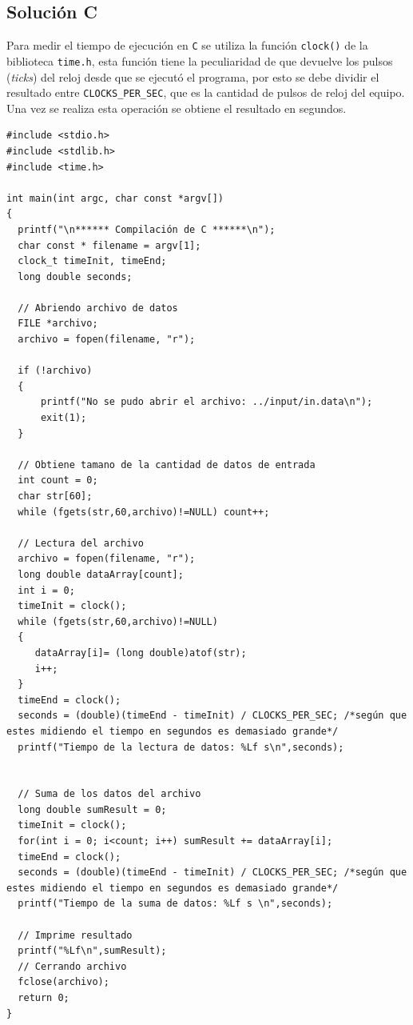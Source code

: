 \subsection{Solución C}

Para medir el tiempo de ejecución en \texttt{C} se utiliza la función \texttt{clock()} de la biblioteca \texttt{time.h}, esta función tiene la peculiaridad de que devuelve los pulsos (\textit{ticks}) del reloj desde que se ejecutó el programa, por esto se debe dividir el resultado entre \texttt{CLOCKS\_PER\_SEC}, que es la cantidad de pulsos de reloj del equipo. Una vez se realiza esta operación se obtiene el resultado en segundos.

\begin{verbatim}
#include <stdio.h>
#include <stdlib.h>
#include <time.h>

int main(int argc, char const *argv[])
{
  printf("\n****** Compilación de C ******\n");
  char const * filename = argv[1];
  clock_t timeInit, timeEnd;
  long double seconds;

  // Abriendo archivo de datos
  FILE *archivo;
  archivo = fopen(filename, "r");

  if (!archivo)
  {
      printf("No se pudo abrir el archivo: ../input/in.data\n");
      exit(1);
  }

  // Obtiene tamano de la cantidad de datos de entrada
  int count = 0;
  char str[60];
  while (fgets(str,60,archivo)!=NULL) count++;

  // Lectura del archivo
  archivo = fopen(filename, "r");
  long double dataArray[count];
  int i = 0;
  timeInit = clock();
  while (fgets(str,60,archivo)!=NULL)
  {
     dataArray[i]= (long double)atof(str);
     i++;
  }
  timeEnd = clock();
  seconds = (double)(timeEnd - timeInit) / CLOCKS_PER_SEC; /*según que estes midiendo el tiempo en segundos es demasiado grande*/
  printf("Tiempo de la lectura de datos: %Lf s\n",seconds);


  // Suma de los datos del archivo
  long double sumResult = 0;
  timeInit = clock();
  for(int i = 0; i<count; i++) sumResult += dataArray[i];
  timeEnd = clock();
  seconds = (double)(timeEnd - timeInit) / CLOCKS_PER_SEC; /*según que estes midiendo el tiempo en segundos es demasiado grande*/
  printf("Tiempo de la suma de datos: %Lf s \n",seconds);

  // Imprime resultado
  printf("%Lf\n",sumResult);
  // Cerrando archivo
  fclose(archivo);
  return 0;
}
\end{verbatim}


